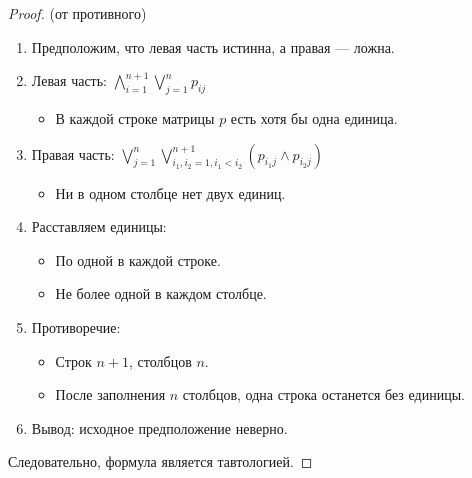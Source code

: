\documentclass[12pt,a4paper]{article}
\begin{document}
\begin{proof} (от противного)

\begin{enumerate}[label=\arabic*., leftmargin=*]
\item Предположим, что левая часть истинна, а правая — ложна.

\item Левая часть: $\bigwedge_{i=1}^{n+1} \bigvee_{j=1}^n p_{ij}$
   \begin{itemize}
   \item В каждой строке матрицы $p$ есть хотя бы одна единица.
   \end{itemize}

\item Правая часть: $\bigvee_{j=1}^n \bigvee_{i_1, i_2=1, i_1<i_2}^{n+1} (p_{i_1j} \wedge p_{i_2j})$
   \begin{itemize}
   \item Ни в одном столбце нет двух единиц.
   \end{itemize}

\item Расставляем единицы:
   \begin{itemize}
   \item По одной в каждой строке.
   \item Не более одной в каждом столбце.
   \end{itemize}

\item Противоречие:
   \begin{itemize}
   \item Строк $n+1$, столбцов $n$.
   \item После заполнения $n$ столбцов, одна строка останется без единицы.
   \end{itemize}

\item Вывод: исходное предположение неверно.
\end{enumerate}

Следовательно, формула является тавтологией.
\end{proof}
\end{document}
